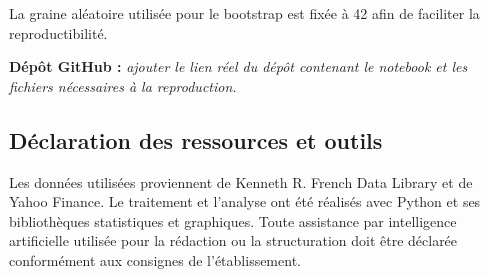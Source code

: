 \documentclass[12pt,a4paper]{article}
\begin{document}
La graine aléatoire utilisée pour le bootstrap est fixée à 42 afin de faciliter la reproductibilité.

\textbf{Dépôt GitHub :} \textit{ajouter le lien réel du dépôt contenant le notebook et les fichiers nécessaires à la reproduction.}

\subsection*{Déclaration des ressources et outils}

Les données utilisées proviennent de Kenneth R. French Data Library et de Yahoo Finance. Le traitement et l'analyse ont été réalisés avec Python et ses bibliothèques statistiques et graphiques. Toute assistance par intelligence artificielle utilisée pour la rédaction ou la structuration doit être déclarée conformément aux consignes de l'établissement.
\end{document}
